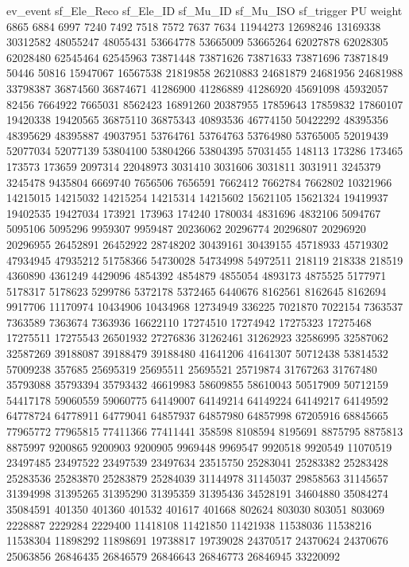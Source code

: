 ev_event   sf_Ele_Reco   sf_Ele_ID      sf_Mu_ID   sf_Mu_ISO   sf_trigger   PU weight
6865
6884
6997
7240
7492
7518
7572
7637
7634
11944273
12698246
13169338
30312582
48055247
48055431
53664778
53665009
53665264
62027878
62028305
62028480
62545464
62545963
73871448
73871626
73871633
73871696
73871849
50446
50816
15947067
16567538
21819858
26210883
24681879
24681956
24681988
33798387
36874560
36874671
41286900
41286889
41286920
45691098
45932057
82456
7664922
7665031
8562423
16891260
20387955
17859643
17859832
17860107
19420338
19420565
36875110
36875343
40893536
46774150
50422292
48395356
48395629
48395887
49037951
53764761
53764763
53764980
53765005
52019439
52077034
52077139
53804100
53804266
53804395
57031455
148113
173286
173465
173573
173659
2097314
22048973
3031410
3031606
3031811
3031911
3245379
3245478
9435804
6669740
7656506
7656591
7662412
7662784
7662802
10321966
14215015
14215032
14215254
14215314
14215602
15621105
15621324
19419937
19402535
19427034
173921
173963
174240
1780034
4831696
4832106
5094767
5095106
5095296
9959307
9959487
20236062
20296774
20296807
20296920
20296955
26452891
26452922
28748202
30439161
30439155
45718933
45719302
47934945
47935212
51758366
54730028
54734998
54972511
218119
218338
218519
4360890
4361249
4429096
4854392
4854879
4855054
4893173
4875525
5177971
5178317
5178623
5299786
5372178
5372465
6440676
8162561
8162645
8162694
9917706
11170974
10434906
10434968
12734949
336225
7021870
7022154
7363537
7363589
7363674
7363936
16622110
17274510
17274942
17275323
17275468
17275511
17275543
26501932
27276836
31262461
31262923
32586995
32587062
32587269
39188087
39188479
39188480
41641206
41641307
50712438
53814532
57009238
357685
25695319
25695511
25695521
25719874
31767263
31767480
35793088
35793394
35793432
46619983
58609855
58610043
50517909
50712159
54417178
59060559
59060775
64149007
64149214
64149224
64149217
64149592
64778724
64778911
64779041
64857937
64857980
64857998
67205916
68845665
77965772
77965815
77411366
77411441
358598
8108594
8195691
8875795
8875813
8875997
9200865
9200903
9200905
9969448
9969547
9920518
9920549
11070519
23497485
23497522
23497539
23497634
23515750
25283041
25283382
25283428
25283536
25283870
25283879
25284039
31144978
31145037
29858563
31145657
31394998
31395265
31395290
31395359
31395436
34528191
34604880
35084274
35084591
401350
401360
401532
401617
401668
802624
803030
803051
803069
2228887
2229284
2229400
11418108
11421850
11421938
11538036
11538216
11538304
11898292
11898691
19738817
19739028
24370517
24370624
24370676
25063856
26846435
26846579
26846643
26846773
26846945
33220092
